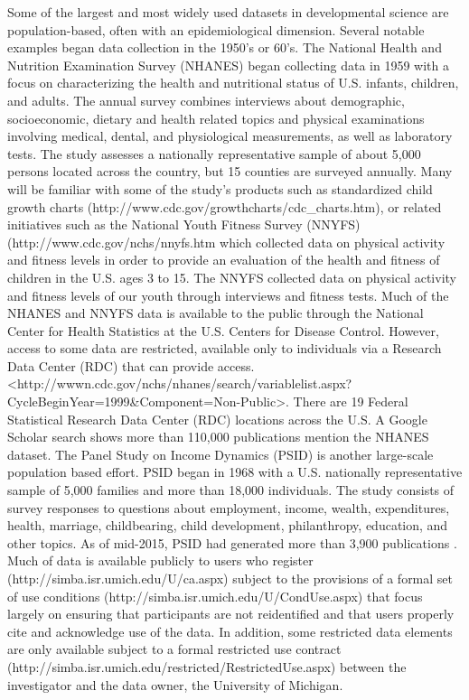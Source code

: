 \documentclass[letterpaper,man,apacite]{apa6}
\begin{document}
Some of the largest and most widely used datasets in developmental science are population-based, often with an epidemiological dimension.
Several notable examples began data collection in the 1950's or 60's.
The National Health and Nutrition Examination Survey (NHANES) \cite{NHANES} began collecting data in 1959 with a focus on characterizing the health and nutritional status of U.S. infants, children, and adults. 
The annual survey combines interviews about demographic, socioeconomic, dietary and health related topics and physical examinations involving medical, dental, and physiological measurements, as well as laboratory tests.
The study assesses a nationally representative sample of about 5,000 persons located across the country, but 15 counties are surveyed annually.
Many will be familiar with some of the study's products such as standardized child growth charts (http://www.cdc.gov/growthcharts/cdc_charts.htm), or related initiatives such as the National Youth Fitness Survey (NNYFS) (http://www.cdc.gov/nchs/nnyfs.htm which collected data on physical activity and fitness levels in order to provide an evaluation of the health and fitness of children in the U.S. ages 3 to 15. 
The NNYFS collected data on physical activity and fitness levels of our youth through interviews and fitness tests.
Much of the NHANES and NNYFS data is available to the public through the National Center for Health Statistics at the U.S. Centers for Disease Control.
However, access to some data are restricted, available only to individuals via a Research Data Center (RDC) that can provide access.
<http://wwwn.cdc.gov/nchs/nhanes/search/variablelist.aspx?CycleBeginYear=1999&Component=Non-Public>.
There are 19 Federal Statistical Research Data Center (RDC) locations across the U.S.
A Google Scholar search shows more than 110,000 publications mention the NHANES dataset.
The Panel Study on Income Dynamics (PSID) \cite{PSID} is another large-scale population based effort.
PSID began in 1968 with a U.S. nationally representative sample of 5,000 families and more than 18,000 individuals.
The study consists of survey responses to questions about employment, income, wealth, expenditures, health, marriage, childbearing, child development, philanthropy, education, and other topics. As of mid-2015, PSID had generated more than 3,900 publications \cite{PSID_pubs}. 
Much of data is available publicly to users who register (http://simba.isr.umich.edu/U/ca.aspx) subject to the provisions of a formal set of use conditions (http://simba.isr.umich.edu/U/CondUse.aspx) that focus largely on ensuring that participants are not reidentified and that users properly cite and acknowledge use of the data. 
In addition, some restricted data elements are only available subject to a formal restricted use contract (http://simba.isr.umich.edu/restricted/RestrictedUse.aspx) between the investigator and the data owner, the University of Michigan.
\end{document}
